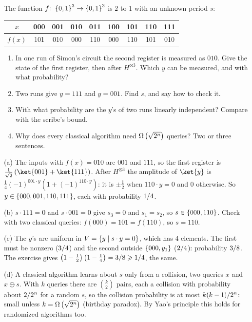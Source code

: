 \begin{question}
    The function $f \colon \left\lbrace0,1\right\rbrace^3 \to \left\lbrace0,1\right\rbrace^3$ is $2$-to-$1$ with an unknown period $s$:
    \begin{center}
        \begin{tabular}{c|cccccccc}
            $x$    & 000 & 001 & 010 & 011 & 100 & 101 & 110 & 111 \\ \hline
            $f(x)$ & 101 & 010 & 000 & 110 & 000 & 110 & 101 & 010
        \end{tabular}
    \end{center}
    \begin{enumerate}[label=(\alph*)]
        \item In one run of Simon's circuit the second register is measured as $010$. Give the state
              of the first register, then after $H^{\otimes 3}$. Which $y$ can be measured, and with
              what probability?
        \item Two runs give $y = 111$ and $y = 001$. Find $s$, and say how to check it.
        \item With what probability are the $y$'s of two runs linearly independent? Compare with
              the scribe's bound.
        \item Why does every classical algorithm need $\Omega\left(\sqrt{2^n}\right)$ queries? Two or three
              sentences.
    \end{enumerate}
\end{question}
\begin{msolution}
    (a) The inputs with $f(x) = 010$ are $001$ and $111$, so the first register is
    $\frac{1}{\sqrt{2}}\left(\ket{001} + \ket{111}\right)$. After $H^{\otimes 3}$ the amplitude of
    $\ket{y}$ is $\frac{1}{4}(-1)^{001 \cdot y}\left(1 + (-1)^{110 \cdot y}\right)$: it is
    $\pm\frac{1}{2}$ when $110 \cdot y = 0$ and $0$ otherwise. So $y \in \left\lbrace000, 001, 110, 111\right\rbrace$,
    each with probability $1/4$.

    (b) $s \cdot 111 = 0$ and $s \cdot 001 = 0$ give $s_3 = 0$ and $s_1 = s_2$, so $s \in \left\lbrace000,
    110\right\rbrace$. Check with two classical queries: $f(000) = 101 = f(110)$, so $s = 110$.

    (c) The $y$'s are uniform in $V = \left\lbrace y \mid s \cdot y = 0\right\rbrace$, which has $4$ elements. The
    first must be nonzero ($3/4$) and the second outside $\left\lbrace000, y_1\right\rbrace$ ($2/4$):
    probability $3/8$. The exercise gives $\left(1 - \frac{1}{2}\right)\left(1 - \frac{1}{4}\right)
    = 3/8 \geqslant 1/4$, the same.

    (d) A classical algorithm learns about $s$ only from a collision, two queries $x$ and
    $x \oplus s$. With $k$ queries there are $\binom{k}{2}$ pairs, each a collision with
    probability about $2/2^n$ for a random $s$, so the collision probability is at most
    $k(k-1)/2^n$: small unless $k = \Omega\left(\sqrt{2^n}\right)$ (birthday paradox). By Yao's
    principle this holds for randomized algorithms too.
\end{msolution}

